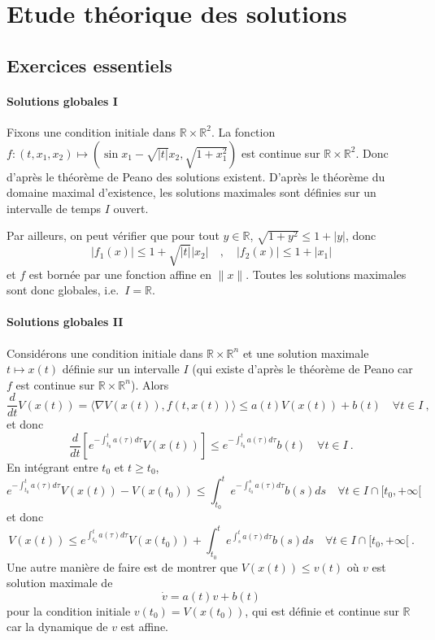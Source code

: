 \hypertarget{solutions-des-exercices}{%
\chapter{Etude théorique des solutions}\label{solutions-des-exercices}}

\hypertarget{exercices-essentiels}{%
\section{Exercices essentiels}\label{exercices-essentiels}}

\hypertarget{answer-glob_sol}{%
\subsubsection*{Solutions globales I}\label{answer-glob_sol}}


Fixons une condition initiale dans \(\mathbb{R}\times \mathbb{R}^2\). La
fonction
\(f:(t,x_1,x_2)\mapsto (\sin x_1 - \sqrt{|t|} x_2 ,\sqrt{1+x_1^2})\) est
continue sur \(\mathbb{R}\times\mathbb{R}^2\). Donc d'après le théorème
de Peano des solutions existent. D'après le théorème du domaine maximal
d'existence, les solutions maximales sont définies sur un intervalle de
temps \(I\) ouvert.

Par ailleurs, on peut vérifier que pour tout \(y\in \mathbb{R}\),
\(\sqrt{1+y^2}\leq 1+|y|\), donc \[
|f_1(x)| \leq 1 + \sqrt{|t|} |x_2| \quad , \quad |f_2(x)|\leq 1 + |x_1|
\] et \(f\) est bornée par une fonction affine en \(\|x\|\). Toutes les
solutions maximales sont donc globales, i.e.~\(I=\mathbb{R}\).

\hypertarget{answer-glob_sol2}{%
\subsubsection*{Solutions globales II}\label{answer-glob_sol2}}


Considérons une condition initiale dans
\(\mathbb{R}\times \mathbb{R}^n\) et une solution maximale
\(t\mapsto x(t)\) définie sur un intervalle \(I\) (qui existe d'après le
théorème de Peano car \(f\) est continue sur
\(\mathbb{R}\times \mathbb{R}^n\)). Alors \[
\frac{d}{dt} V(x(t)) = \langle\nabla V (x(t)), f(t,x(t))\rangle \leq a(t) V(x(t)) + b(t) \quad \forall t\in I \ ,
\] et donc \[
\frac{d}{dt} \left[e^{-\int_{t_0}^t a(\tau) d\tau}  V(x(t))\right] \leq e^{-\int_{t_0}^t a(\tau) d\tau} b(t)  \quad \forall t\in I \ .
\] En intégrant entre \(t_0\) et \(t\geq t_0\), \[
e^{-\int_{t_0}^t a(\tau) d\tau} V(x(t)) - V(x(t_0)) \leq \int_{t_0}^t e^{-\int_{t_0}^s a(\tau) d\tau} b(s) ds \quad \forall t\in I \cap [t_0,+\infty[
\] et donc \[
V(x(t)) \leq e^{\int_{t_0}^t a(\tau) d\tau} V(x(t_0)) + \int_{t_0}^t e^{\int_{s}^t a(\tau) d\tau} b(s) ds \quad \forall t\in I \cap [t_0,+\infty[ \ .
\] Une autre manière de faire est de montrer que \(V(x(t))\leq v(t)\) où
\(v\) est solution maximale de \[
\dot{v} = a(t) v + b(t)
\] pour la condition initiale \(v(t_0) = V(x(t_0))\), qui est définie
et continue sur \(\mathbb{R}\) car la dynamique de \(v\) est affine.

